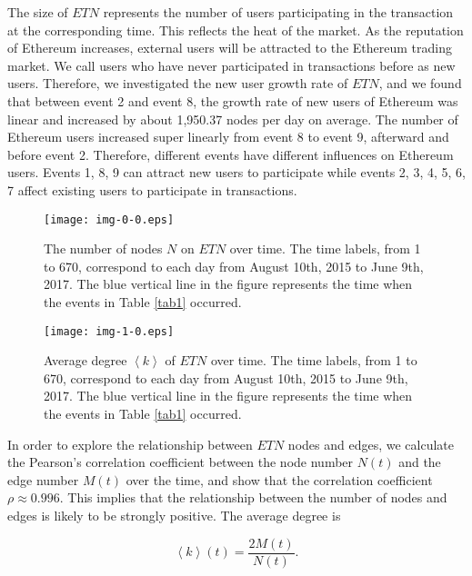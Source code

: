 \documentclass[conference]{IEEEtran}
\begin{document}
\begin{CJK*}{UTF8}{gbsn}
The size of $ETN$ represents the number of users participating in the transaction at the corresponding time. This reflects the heat of the market. As the reputation of Ethereum increases, external users will be attracted to the Ethereum trading market. We call users who have never participated in transactions before as new users. Therefore, we investigated the new user growth rate of $ETN$, and we found that between event 2 and event 8, the growth rate of new users of Ethereum was linear and increased by about 1,950.37 nodes per day on average. The number of Ethereum users increased super linearly from event 8 to event 9, afterward and before event 2. Therefore, different events have different influences on Ethereum users. Events 1, 8, 9 can attract new users to participate while events 2, 3, 4, 5, 6, 7 affect existing users to participate in transactions.

\begin{figure}[htbp]
\centering
\texttt{[image: img-0-0.eps]}
\caption{The number of nodes $N$ on $ETN$ over time. The time labels, from 1 to 670, correspond to each day from August 10th, 2015 to June 9th, 2017. The blue vertical line in the figure represents the time when the events in Table \ref{tab1} occurred.}
\label{fig1}
\end{figure}


\begin{figure}[htbp]
\centering
\texttt{[image: img-1-0.eps]}
\caption{Average degree $ \left \langle k \right \rangle$ of $ETN$ over time. The time labels, from 1 to 670, correspond to each day from August 10th, 2015 to June 9th, 2017. The blue vertical line in the figure represents the time when the events in Table \ref{tab1} occurred. }
\label{fig2}
\end{figure}

In order to explore the relationship between $ETN$ nodes and edges, we calculate the Pearson's correlation coefficient between the node number $N(t)$ and the edge number $M(t)$ over the time, and show that the correlation coefficient $\rho \approx 0.996$. This implies that the relationship between the number of nodes and edges is likely to be strongly positive. The average degree is

\begin{equation}
\left\langle k \right\rangle (t)=\frac{2M(t)}{N(t)}.
\end{equation}


\end{CJK*}
\end{document}
